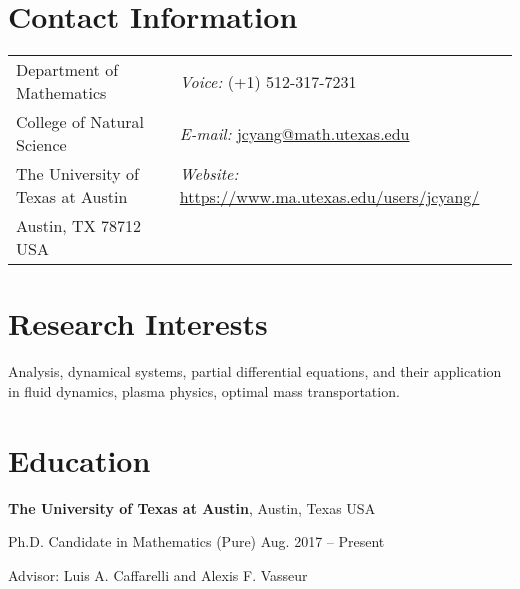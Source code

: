 \documentclass[margin,line]{res}
\newenvironment{list1}{
  \begin{list}{\ding{113}}{%
      \setlength{\itemsep}{0in}
      \setlength{\parsep}{0in} \setlength{\parskip}{0in}
      \setlength{\topsep}{0in} \setlength{\partopsep}{0in} 
      \setlength{\leftmargin}{0.17in}}}{\end{list}}
\begin{document}
\vspace*{-0.4in}

\begin{resume}

\section{\sc Contact Information}
\begin{tabular}{@{}p{2.5in}p{3.25in}}        
Department of Mathematics & {\it Voice:} (+1) 512-317-7231 \\
College of Natural Science & {\it E-mail:} \href{mailto:jcyang@math.utexas.edu}{\sf jcyang@math.utexas.edu}\\
The University of Texas at Austin & {\it Website:} \href{https://www.ma.utexas.edu/users/jcyang/}{\sf https://www.ma.utexas.edu/users/jcyang/}\\
Austin, TX 78712 USA & 
\end{tabular}


\section{\sc Research Interests}
Analysis, dynamical systems, partial differential equations, and their application in fluid dynamics, plasma physics, optimal mass transportation.

\section{\sc Education}

{\bf The University of Texas at Austin}, Austin, Texas USA\\
\vspace*{-.1in}
\begin{list1}
\item[] Ph.D. Candidate in Mathematics (Pure) \hfill Aug. 2017 -- Present
\item[] Advisor: Luis A. Caffarelli and Alexis F. Vasseur
\end{list1}


\end{resume}
\end{document}
